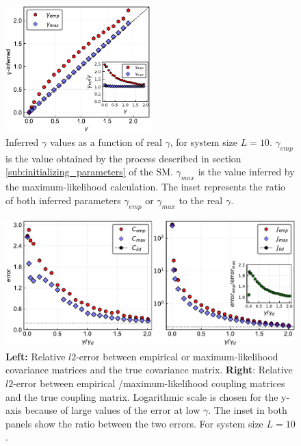 \documentclass[preprint,amsmath,amssymb,superscriptaddress,showpacs,pre]{revtex4-1}
\begin{document}
\begin{figure}[!htb]
	\centering
	\includegraphics[keepaspectratio=true,width=0.5\textwidth]{Figures/scatter_gamma_L10_100.pdf}
	\caption{Inferred $\gamma$ values as a function of real $\gamma$, for system size $L=10$. $\gamma_{emp}$ is the value obtained by the process described in section \ref{sub:initializing_parameters} of the SM. $\gamma_{max}$ is the value inferred by the maximum-likelihood calculation. 
	The inset represents the ratio of both inferred parameters $\gamma_{emp}$ or $\gamma_{max}$ to the real $\gamma$. }
	\label{fig:scatter_gamma_L10}
\end{figure}


 \begin{figure}[!htb]
 			\centering\includegraphics[keepaspectratio=true,width=1.0\textwidth]{Figures/epsilon_error_L10_balanced_tree_100.pdf}
 		\hspace{1mm}
 	\caption{\textbf{Left:} Relative $l2$-error between empirical or maximum-likelihood covariance matrices and the true covariance matrix. \textbf{Right}: Relative $l2$-error between empirical /maximum-likelihood coupling matrices and the true coupling matrix. Logarithmic scale is chosen for the y-axis because of large values of the error at low $\gamma$. The inset in both panels show the ratio between the two errors. For system size $L=10$.}
 	\label{fig:error_1_L10}
 \end{figure}
\end{document}
